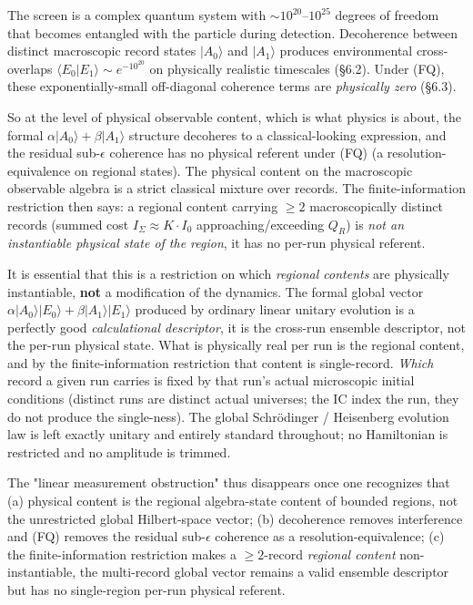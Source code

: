 \documentclass[11pt,a4paper]{article}
\begin{document}
The screen is a complex quantum system with $\sim 10^{20}$–$10^{25}$ degrees of freedom that becomes entangled with the particle during detection. Decoherence between distinct macroscopic record states $|A_0\rangle$ and $|A_1\rangle$ produces environmental cross-overlaps $\langle E_0 | E_1 \rangle \sim e^{-10^{20}}$ on physically realistic timescales (§6.2). Under (FQ), these exponentially-small off-diagonal coherence terms are \emph{physically zero} (§6.3).

So at the level of physical observable content, which is what physics is about, the formal $\alpha|A_0\rangle + \beta|A_1\rangle$ structure decoheres to a classical-looking expression, and the residual sub-$\epsilon$ coherence has no physical referent under (FQ) (a resolution-equivalence on regional states). The physical content on the macroscopic observable algebra is a strict classical mixture over records. The finite-information restriction then says: a regional content carrying $\ge 2$ macroscopically distinct records (summed cost $I_\Sigma \approx K\cdot I_0$ approaching/exceeding $Q_R$) is \emph{not an instantiable physical state of the region}, it has no per-run physical referent.

It is essential that this is a restriction on which \emph{regional contents} are physically instantiable, \textbf{not} a modification of the dynamics. The formal global vector $\alpha|A_0\rangle|E_0\rangle + \beta|A_1\rangle|E_1\rangle$ produced by ordinary linear unitary evolution is a perfectly good \emph{calculational descriptor}, it is the cross-run ensemble descriptor, not the per-run physical state. What is physically real per run is the regional content, and by the finite-information restriction that content is single-record. \emph{Which} record a given run carries is fixed by that run's actual microscopic initial conditions (distinct runs are distinct actual universes; the IC index the run, they do not produce the single-ness). The global Schrödinger / Heisenberg evolution law is left exactly unitary and entirely standard throughout; no Hamiltonian is restricted and no amplitude is trimmed.

The "linear measurement obstruction" thus disappears once one recognizes that (a) physical content is the regional algebra-state content of bounded regions, not the unrestricted global Hilbert-space vector; (b) decoherence removes interference and (FQ) removes the residual sub-$\epsilon$ coherence as a resolution-equivalence; (c) the finite-information restriction makes a $\ge 2$-record \emph{regional content} non-instantiable, the multi-record global vector remains a valid ensemble descriptor but has no single-region per-run physical referent.
\end{document}
